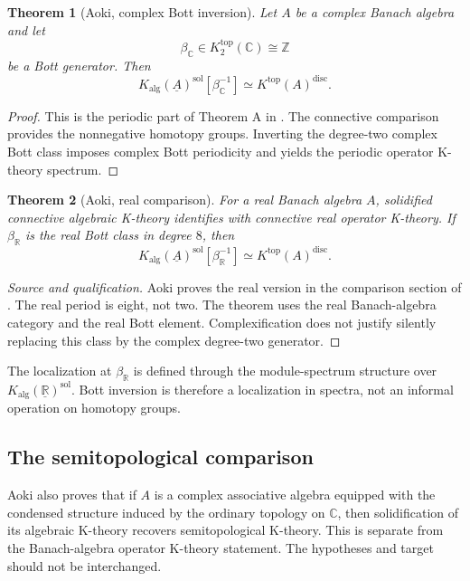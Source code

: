 \documentclass[12pt]{article}
\newtheorem{theorem}{Theorem}[section]
\theoremstyle{definition}
\theoremstyle{remark}
\newcommand{\C}{\mathbb C}
\newcommand{\R}{\mathbb R}
\newcommand{\Z}{\mathbb Z}
\newcommand{\Kalg}{K_{\mathrm{alg}}}
\newcommand{\Ktop}{K^{\mathrm{top}}}
\begin{document}
\begin{theorem}[Aoki, complex Bott inversion]\label{thm:aoki-bott}
Let $A$ be a complex Banach algebra and let
\[
\beta_{\C}\in K^{\mathrm{top}}_2(\C)\cong\Z
\]
be a Bott generator.  Then
\[
\Kalg(\underline A)^{\mathrm{sol}}[\beta_{\C}^{-1}]
\simeq
\Ktop(A)^{\mathrm{disc}}.
\]
\end{theorem}

\begin{proof}
This is the periodic part of Theorem A in \cite{Aoki}.  The connective comparison
provides the nonnegative homotopy groups.  Inverting the degree-two complex Bott
class imposes complex Bott periodicity and yields the periodic operator K-theory
spectrum.
\end{proof}

\begin{theorem}[Aoki, real comparison]\label{thm:aoki-real}
For a real Banach algebra $A$, solidified connective algebraic K-theory identifies
with connective real operator K-theory.  If
$\beta_{\R}$ is the real Bott class in degree $8$, then
\[
\Kalg(\underline A)^{\mathrm{sol}}[\beta_{\R}^{-1}]
\simeq
\Ktop(A)^{\mathrm{disc}}.
\]
\end{theorem}

\begin{proof}[Source and qualification]
Aoki proves the real version in the comparison section of \cite{Aoki}.  The real
period is eight, not two.  The theorem uses the real Banach-algebra category and the
real Bott element.  Complexification does not justify silently replacing this class
by the complex degree-two generator.
\end{proof}

The localization at $\beta_{\R}$ is defined through the module-spectrum structure
over $\Kalg(\underline{\R})^{\mathrm{sol}}$.  Bott inversion is therefore a
localization in spectra, not an informal operation on homotopy groups.

\subsection{The semitopological comparison}

Aoki also proves that if $A$ is a complex associative algebra equipped with the
condensed structure induced by the ordinary topology on $\C$, then
solidification of its algebraic K-theory recovers semitopological K-theory.  This is
separate from the Banach-algebra operator K-theory statement.  The hypotheses and
target should not be interchanged.
\end{document}
